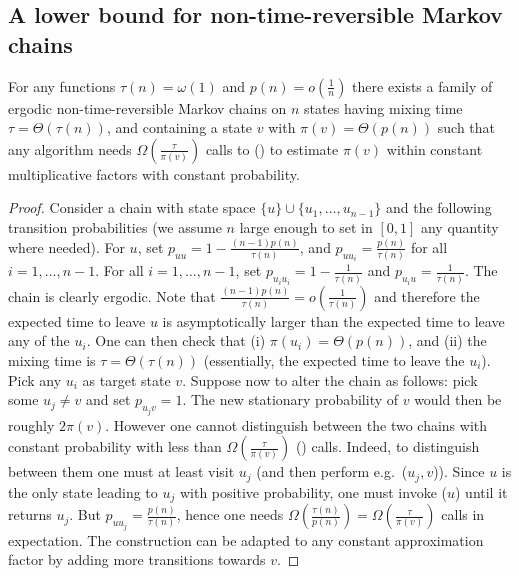\subsection{A lower bound for non-time-reversible Markov chains}
\label{sub:general_impossible}
\begin{lemma}
For any functions $\tau(n) = \omega(1)$ and $p(n) = o(\frac{1}{n})$ there exists a family of ergodic non-time-reversible Markov chains on $n$ states having mixing time $\tau = \Theta(\tau(n))$, and containing a state $v$ with $\pi(v) = \Theta(p(n))$ such that any algorithm needs $\Omega(\frac{\tau}{\pi(v)})$ calls to \step() to estimate $\pi(v)$ within constant multiplicative factors with constant probability.
\end{lemma}
\begin{proof}
Consider a chain with state space $\{u\} \cup \{u_1,\ldots,u_{n-1}\}$ and
the following transition probabilities (we assume $n$ large enough to set in $[0,1]$ any quantity where needed).
For $u$, set $p_{uu} = 1-\frac{(n-1)p(n)}{\tau(n)}$, and $p_{uu_i} = \frac{p(n)}{\tau(n)}$ for all $i=1,\ldots,n-1$.
For all $i=1,\ldots,n-1$, set $p_{u_i u_i} = 1-\frac{1}{\tau(n)}$ and $p_{u_i u} = \frac{1}{\tau(n)}$.
The chain is clearly ergodic.
Note that $\frac{(n-1)p(n)}{\tau(n)} = o(\frac{1}{\tau(n)})$ and therefore the expected time to leave $u$ is asymptotically larger than the expected time to leave any of the $u_i$.
One can then check that (i) $\pi(u_i) = \Theta(p(n))$, and (ii) the mixing time is $\tau = \Theta(\tau(n))$ (essentially, the expected time to leave the $u_i$).
Pick any $u_i$ as target state $v$.
Suppose now to alter the chain as follows: pick some $u_j \ne v$ and set $p_{u_j v} = 1$.
The new stationary probability of $v$ would then be roughly $2\pi(v)$.
However one cannot distinguish between the two chains with constant probability with less than
$\Omega(\frac{\tau}{\pi(v)})$ \step() calls.
Indeed, to distinguish between them one must at least visit $u_j$ (and then perform e.g.\ \probe($u_j,v$)).
Since $u$ is the only state leading to $u_j$ with positive probability, one must invoke \step($u$) until it returns $u_j$.
But $p_{uu_j}=\frac{p(n)}{\tau(n)}$, hence one needs $\Omega(\frac{\tau(n)}{p(n)}) = \Omega(\frac{\tau}{\pi(v)})$ calls in expectation.
The construction can be adapted to any constant approximation factor by adding more transitions towards $v$.
\end{proof}


\clearpage
